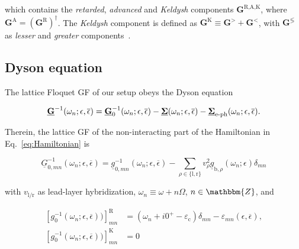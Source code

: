 \documentclass[aps,prb,groupedaddress,showpacs,twocolumn,superscriptaddress,10pt]{revtex4-2}
\begin{document}
which contains the \emph{retarded}, \emph{advanced} and \emph{Keldysh} components $\textbf{G}^{\text{R,A,K}}$, where $\textbf{G}^{\text{A}}=(\textbf{G}^{\text{R}})^{\dagger}$. The \emph{Keldysh} component is defined as $\textbf{G}^{\text{K}} \equiv \textbf{G}^{>} + \textbf{G}^{<}$, with $\textbf{G}^{\lessgtr}$ as \emph{lesser} and \emph{greater} components~\cite{schw.61,keld.65,ra.sm.86,ha.ja}.
  
\subsection{Dyson equation} 
\label{sec:Dyson_equation}

The lattice Floquet GF of our setup obeys the Dyson equation 

\begin{equation}\label{eq:FullDysonEq}
\underline{{\bf G}}^{-1}(\omega_n;\epsilon,\overline{\epsilon}) = \underline{{\bf G}}^{-1}_{0}(\omega_n;\epsilon,\overline{\epsilon}) - \underline{{\bf \Sigma}}(\omega_n;\epsilon,\overline{\epsilon}) - \underline{{\bf \Sigma}}_{\text{e-ph}}(\omega_n;\epsilon,\overline{\epsilon}).
\end{equation}

Therein, the lattice GF of the non-interacting part of the Hamiltonian in Eq.~\eqref{eq:Hamiltonian} is 

\begin{equation}\label{eq:non-int_InvGF} 
\underline{G}^{-1}_{0,mn}(\omega_n;\epsilon,\overline{\epsilon}) =  \underline{g}^{-1}_{0,mn}(\omega_n;\epsilon,\overline{\epsilon}) - \sum_{\rho\in\{\text{l},\text{r}\}}v^2_{\rho}\underline{g}_{\text{b},\rho}(\omega_n;\epsilon)\delta_{mn}
\end{equation}

with $v_{\text{l}/\text{r}}$ as lead-layer hybridization, $\omega_n \equiv \omega + n\Omega$, $n\in\mathbbm{Z}$, and 

\begin{equation}\label{eq:inv_non-int_lat_GF_comps}
\begin{split}
\left[ g^{-1}_{0}(\omega_n;\epsilon,\overline{\epsilon})) \right]^{\text{R}}_{mn} & = \left( \omega_n + i0^{+} -\varepsilon_{\text{c}} \right)\delta_{mn} - \varepsilon_{mn}(\epsilon,\overline{\epsilon}), \\
\left[ g^{-1}_{0}(\omega_n;\epsilon,\overline{\epsilon})) \right]^{\text{K}}_{mn} & = 0
\end{split}
\end{equation}
\end{document}
